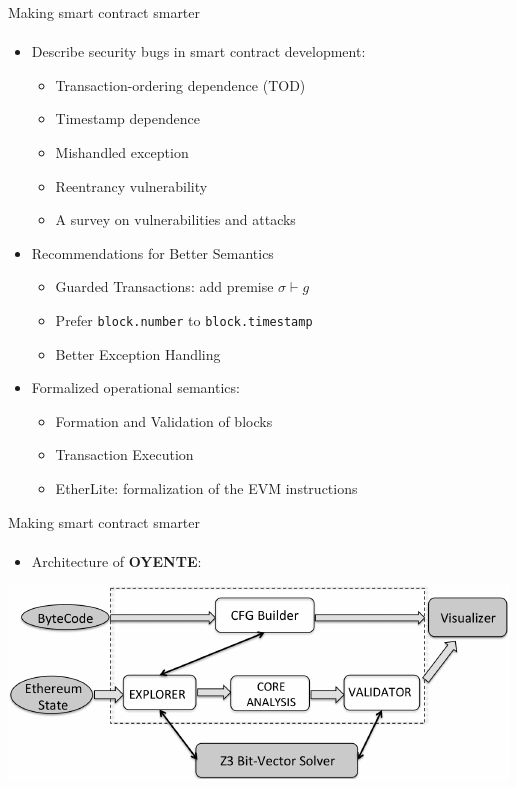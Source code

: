 
\begin{frame}{Making smart contract smarter}
\framesubtitle{\cite{luu2016making}}

\begin{itemize}
\item Describe security bugs in smart contract development:
\begin{itemize}
\item Transaction-ordering dependence (TOD)
\item Timestamp dependence
\item Mishandled exception
\item Reentrancy vulnerability
\item A survey on vulnerabilities and attacks~\cite{bib:atzei}
\end{itemize}
\item Recommendations for Better Semantics
\begin{itemize}
\item Guarded Transactions: add premise $\sigma \vdash g$
\item Prefer \texttt{block.number} to \texttt{block.timestamp}
\item Better Exception Handling
\end{itemize}


\item Formalized operational semantics:
\begin{itemize}
\item Formation and Validation of blocks
\item Transaction Execution
\item EtherLite: formalization of the EVM instructions
\end{itemize}
\end{itemize}

\end{frame}

\begin{frame}{Making smart contract smarter}
\framesubtitle{\cite{luu2016making}}
\begin{itemize}
\item Architecture of \textbf{OYENTE}:
\end{itemize}
\begin{center}
	\includegraphics[width=\textwidth]{./img/oyente-architecture.pdf}
\end{center}
\end{frame}

